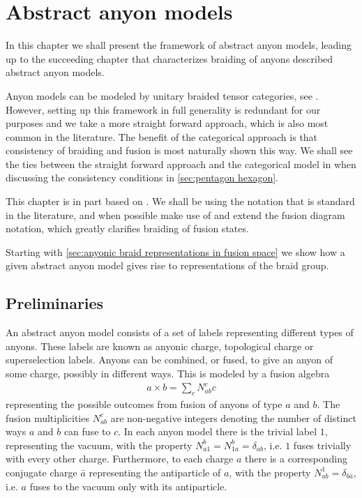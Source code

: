 \documentclass[a4paper,10pt,oneside]{book}
\theoremstyle{plain}
\theoremstyle{definition}
\theoremstyle{remark}
\begin{document}
\chapter{Abstract anyon models}\label{anyon models}

In this chapter we shall present the framework of abstract anyon models, leading up to the succeeding chapter that characterizes braiding of anyons described abstract anyon models.

Anyon models can be modeled by unitary braided tensor categories, see \cite{kitaev,naaijkens}. However, setting up this framework in full generality is redundant for our purposes and we take a more straight forward approach, which is also most common in the literature. The benefit of the categorical approach is that consistency of braiding and fusion is most naturally shown this way. We shall see the ties between the straight forward approach and the categorical model in when discussing the consistency conditions in \cref{sec:pentagon hexagon}.

This chapter is in part based on \cite{preskill,kitaev,bonderson}. We shall be using the notation that is standard in the literature, and when possible make use of and extend the fusion diagram notation, which greatly clarifies braiding of fusion states.

Starting with \cref{sec:anyonic braid representations in fusion space} we show how a given abstract anyon model gives rise to representations of the braid group.

\section{Preliminaries}

An abstract anyon model consists of a set of labels representing different types of anyons. These labels are known as anyonic charge, topological charge or superselection labels. Anyons can be combined, or fused, to give an anyon of some charge, possibly in different ways. This is modeled by a fusion algebra
\begin{align*}
  a \times b = \sum_c N_{ab}^c c
\end{align*}
representing the possible outcomes from fusion of anyons of type $a$ and $b$. The fusion multiplicities $N_{ab}^c$ are non-negative integers denoting the number of distinct ways $a$ and $b$ can fuse to $c$. In each anyon model there is the trivial label $1$, representing the vacuum, with the property $N_{a1}^b = N_{1a}^b = \delta_{ab}$, i.e. $1$ fuses trivially with every other charge. Furthermore, to each charge $a$ there is a corresponding conjugate charge $\bar{a}$ representing the antiparticle of $a$, with the property $N_{ab}^1 = \delta_{b\bar{a}}$, i.e. $a$ fuses to the vacuum only with its antiparticle.
\end{document}
